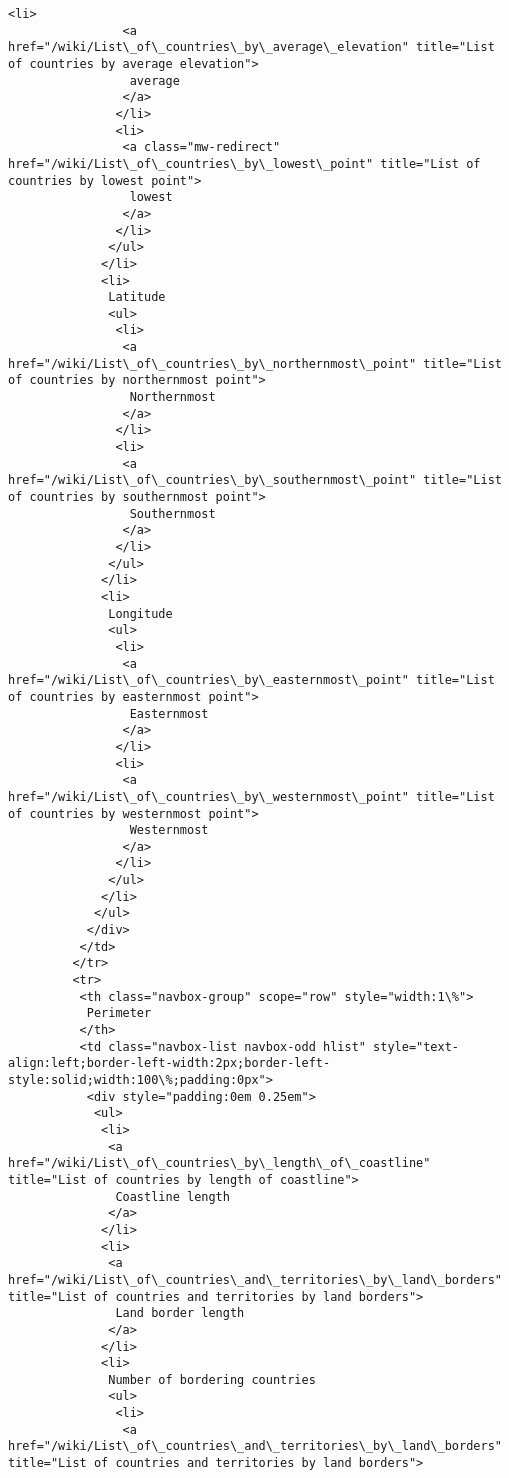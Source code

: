 \documentclass[11pt]{article}
\begin{document}
\begin{Verbatim}[commandchars=\\\{\}]
               <li>
                <a href="/wiki/List\_of\_countries\_by\_average\_elevation" title="List of countries by average elevation">
                 average
                </a>
               </li>
               <li>
                <a class="mw-redirect" href="/wiki/List\_of\_countries\_by\_lowest\_point" title="List of countries by lowest point">
                 lowest
                </a>
               </li>
              </ul>
             </li>
             <li>
              Latitude
              <ul>
               <li>
                <a href="/wiki/List\_of\_countries\_by\_northernmost\_point" title="List of countries by northernmost point">
                 Northernmost
                </a>
               </li>
               <li>
                <a href="/wiki/List\_of\_countries\_by\_southernmost\_point" title="List of countries by southernmost point">
                 Southernmost
                </a>
               </li>
              </ul>
             </li>
             <li>
              Longitude
              <ul>
               <li>
                <a href="/wiki/List\_of\_countries\_by\_easternmost\_point" title="List of countries by easternmost point">
                 Easternmost
                </a>
               </li>
               <li>
                <a href="/wiki/List\_of\_countries\_by\_westernmost\_point" title="List of countries by westernmost point">
                 Westernmost
                </a>
               </li>
              </ul>
             </li>
            </ul>
           </div>
          </td>
         </tr>
         <tr>
          <th class="navbox-group" scope="row" style="width:1\%">
           Perimeter
          </th>
          <td class="navbox-list navbox-odd hlist" style="text-align:left;border-left-width:2px;border-left-style:solid;width:100\%;padding:0px">
           <div style="padding:0em 0.25em">
            <ul>
             <li>
              <a href="/wiki/List\_of\_countries\_by\_length\_of\_coastline" title="List of countries by length of coastline">
               Coastline length
              </a>
             </li>
             <li>
              <a href="/wiki/List\_of\_countries\_and\_territories\_by\_land\_borders" title="List of countries and territories by land borders">
               Land border length
              </a>
             </li>
             <li>
              Number of bordering countries
              <ul>
               <li>
                <a href="/wiki/List\_of\_countries\_and\_territories\_by\_land\_borders" title="List of countries and territories by land borders">

\end{Verbatim}
\end{document}
